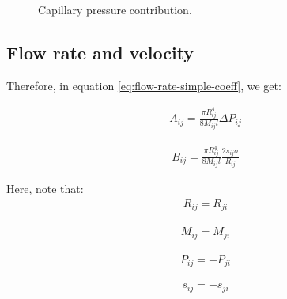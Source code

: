 \documentclass{crm-article}
\begin{document}
		\begin{figure}[H]
			\centering
			\hfill
			\caption{Capillary pressure contribution.}
		\end{figure}
		
	\subsection{Flow rate and velocity} \label{sec:flow-rate-vel}
		Therefore, in equation \ref{eq:flow-rate-simple-coeff}, we get:
		
		\begin{gather} \label{eq:flow-rate-aij}
			A_{ij} = \frac{\pi R_{ij}^4}{8M_{ij}l} \Delta P_{ij}
		\end{gather}
		
		\begin{gather} \label{eq:flow-rate-bij}
			B_{ij} = \frac{\pi R_{ij}^4}{8M_{ij}l} \frac{2 s_{ij} \sigma}{R_{ij}}
		\end{gather}
		
		Here, note that:
		\begin{gather}
			R_{ij} = R_{ji}
		\end{gather}
		
		\begin{gather}
			M_{ij} = M_{ji}
		\end{gather}
		
		\begin{gather}
			P_{ij} = -P_{ji}
		\end{gather}
		
		\begin{gather}
			s_{ij} = -s_{ji}
		\end{gather}
		
\end{document}
